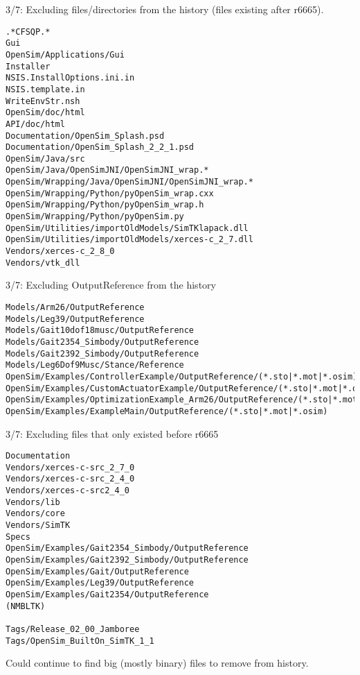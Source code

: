 \documentclass[pdf, 8pt]{beamer}
\def\NUMDECISIONS{7}
\begin{document}
\begin{frame}[fragile]{3/\NUMDECISIONS: Excluding files/directories from the
history (files existing after r6665).}

\begin{Verbatim}
.*CFSQP.*
Gui
OpenSim/Applications/Gui
Installer
NSIS.InstallOptions.ini.in
NSIS.template.in
WriteEnvStr.nsh
OpenSim/doc/html
API/doc/html
Documentation/OpenSim_Splash.psd
Documentation/OpenSim_Splash_2_2_1.psd
OpenSim/Java/src
OpenSim/Java/OpenSimJNI/OpenSimJNI_wrap.*
OpenSim/Wrapping/Java/OpenSimJNI/OpenSimJNI_wrap.*
OpenSim/Wrapping/Python/pyOpenSim_wrap.cxx
OpenSim/Wrapping/Python/pyOpenSim_wrap.h
OpenSim/Wrapping/Python/pyOpenSim.py
OpenSim/Utilities/importOldModels/SimTKlapack.dll
OpenSim/Utilities/importOldModels/xerces-c_2_7.dll
Vendors/xerces-c_2_8_0
Vendors/vtk_dll
\end{Verbatim}

\end{frame}

\begin{frame}[fragile]{3/\NUMDECISIONS: Excluding OutputReference from the history}

\begin{Verbatim}
Models/Arm26/OutputReference
Models/Leg39/OutputReference
Models/Gait10dof18musc/OutputReference
Models/Gait2354_Simbody/OutputReference
Models/Gait2392_Simbody/OutputReference
Models/Leg6Dof9Musc/Stance/Reference
OpenSim/Examples/ControllerExample/OutputReference/(*.sto|*.mot|*.osim)
OpenSim/Examples/CustomActuatorExample/OutputReference/(*.sto|*.mot|*.osim)
OpenSim/Examples/OptimizationExample_Arm26/OutputReference/(*.sto|*.mot|*.osim)
OpenSim/Examples/ExampleMain/OutputReference/(*.sto|*.mot|*.osim)
\end{Verbatim}

\end{frame}

\begin{frame}[fragile]{3/\NUMDECISIONS: Excluding files that only existed
before r6665}

\begin{Verbatim}
Documentation
Vendors/xerces-c-src_2_7_0
Vendors/xerces-c-src_2_4_0
Vendors/xerces-c-src2_4_0
Vendors/lib
Vendors/core
Vendors/SimTK
Specs
OpenSim/Examples/Gait2354_Simbody/OutputReference
OpenSim/Examples/Gait2392_Simbody/OutputReference
OpenSim/Examples/Gait/OutputReference
OpenSim/Examples/Leg39/OutputReference
OpenSim/Examples/Gait2354/OutputReference
(NMBLTK)

Tags/Release_02_00_Jamboree
Tags/OpenSim_BuiltOn_SimTK_1_1
\end{Verbatim}

Could continue to find big (mostly binary) files to remove from history.

\end{frame}
\end{document}
